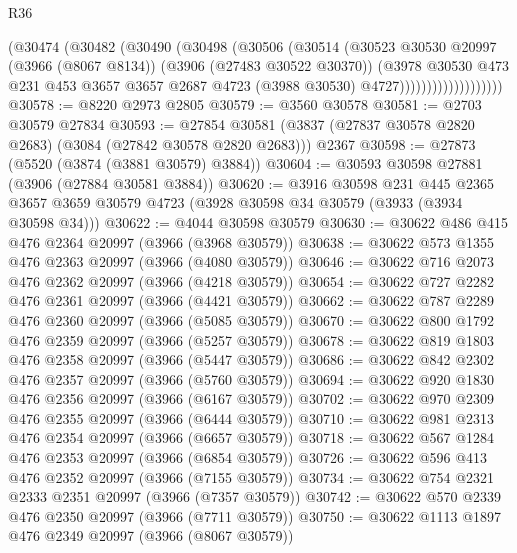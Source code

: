 \begin{lexlean}{R36}
\begin{coremodule}
                          (@30474
                            (@30482
                              (@30490
                                (@30498
                                  (@30506
                                    (@30514
                                      (@30523
                                        @30530
                                        @20997
                                        (@3966 (@8067 @8134))
                                        (@3906 (@27483 @30522 @30370))
                                        (@3978
                                          @30530
                                          @473
                                          @231
                                          @453
                                          @3657
                                          @3657
                                          @2687
                                          @4723
                                          (@3988 @30530)
                                          @4727)))))))))))))))))))
@30578 := @8220 @2973 @2805
@30579 := @3560 @30578
@30581 := @2703 @30579 @27834
@30593 := @27854
    @30581
    (@3837 (@27837 @30578 @2820 @2683) (@3084 (@27842 @30578 @2820 @2683)))
    @2367
@30598 := @27873 (@5520 (@3874 (@3881 @30579) @3884))
@30604 := @30593 @30598 @27881 (@3906 (@27884 @30581 @3884))
@30620 := @3916
    @30598
    @231
    @445
    @2365
    @3657
    @3659
    @30579
    @4723
    (@3928 @30598 @34 @30579 (@3933 (@3934 @30598 @34)))
@30622 := @4044 @30598 @30579
@30630 := @30622 @486 @415 @476 @2364 @20997 (@3966 (@3968 @30579))
@30638 := @30622 @573 @1355 @476 @2363 @20997 (@3966 (@4080 @30579))
@30646 := @30622 @716 @2073 @476 @2362 @20997 (@3966 (@4218 @30579))
@30654 := @30622 @727 @2282 @476 @2361 @20997 (@3966 (@4421 @30579))
@30662 := @30622 @787 @2289 @476 @2360 @20997 (@3966 (@5085 @30579))
@30670 := @30622 @800 @1792 @476 @2359 @20997 (@3966 (@5257 @30579))
@30678 := @30622 @819 @1803 @476 @2358 @20997 (@3966 (@5447 @30579))
@30686 := @30622 @842 @2302 @476 @2357 @20997 (@3966 (@5760 @30579))
@30694 := @30622 @920 @1830 @476 @2356 @20997 (@3966 (@6167 @30579))
@30702 := @30622 @970 @2309 @476 @2355 @20997 (@3966 (@6444 @30579))
@30710 := @30622 @981 @2313 @476 @2354 @20997 (@3966 (@6657 @30579))
@30718 := @30622 @567 @1284 @476 @2353 @20997 (@3966 (@6854 @30579))
@30726 := @30622 @596 @413 @476 @2352 @20997 (@3966 (@7155 @30579))
@30734 := @30622 @754 @2321 @2333 @2351 @20997 (@3966 (@7357 @30579))
@30742 := @30622 @570 @2339 @476 @2350 @20997 (@3966 (@7711 @30579))
@30750 := @30622 @1113 @1897 @476 @2349 @20997 (@3966 (@8067 @30579))

\end{coremodule}
\end{lexlean}
